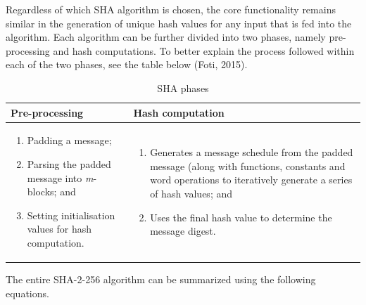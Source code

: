     Regardless of which SHA algorithm is chosen, the core functionality remains similar in the generation of unique hash values for any input that is fed into the algorithm. Each algorithm can be further divided into two phases, namely pre-processing and hash computations. To better explain the process followed within each of the two phases, see the table below (Foti, 2015).
    
    
    \begin{table}[h!]
        \caption{SHA phases}
        \centering
        \begin{tabular}{|p{} | p{}|}
          \hline
         \textbf{Pre-processing} & \textbf{Hash computation} \\
         \hline\hline
            \begin{enumerate}
                \item Padding a message;
                \item Parsing the padded message into \textit{m}-blocks; and
                \item Setting initialisation values for hash computation.
            \end{enumerate}
             & 
             \begin{enumerate}
                 \item Generates a message schedule from the padded message (along with functions, constants and word operations to iteratively generate a series of hash values; and
                 \item Uses the final hash value to determine the message digest.
             \end{enumerate} \\
             \hline
        \end{tabular}
        \label{tab:SHA phases}
    \end{table}
    
    The entire SHA-2-256 algorithm can be summarized using the following equations.
    
    
